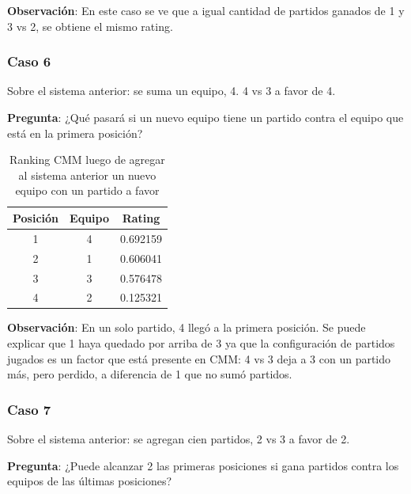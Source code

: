\textbf{Observación}: En este caso se ve que a igual cantidad de partidos ganados de 1 y 3 vs 2, se obtiene el mismo rating.

\subsubsection*{Caso 6}

Sobre el sistema anterior: se suma un equipo, 4. 4 vs 3 a favor de 4.

\textbf{Pregunta}: ¿Qué pasará si un nuevo equipo tiene un partido contra el equipo que está en la primera posición?

\begin{table}[h!]
    \begin{center}
        \begin{tabular}{|c|c|c|}
        \hline
        \textbf{Posición} & \textbf{Equipo} & \textbf{Rating} \\
        \hline
        1 & 4 & 0.692159\\
        2 & 1 & 0.606041\\
        3 & 3 & 0.576478\\
        4 & 2 & 0.125321\\
        \hline
        \end{tabular}
        \caption{Ranking CMM luego de agregar al sistema anterior un nuevo equipo con un partido a favor}
        \label{cmm_caso_6}
    \end{center}
\end{table}

\textbf{Observación}: En un solo partido, 4 llegó a la primera posición. Se puede explicar que 1 haya quedado por arriba de 3 ya que la configuración de partidos jugados es un factor que está presente en CMM: 4 vs 3 deja a 3 con un partido más, pero perdido, a diferencia de 1 que no sumó partidos.

\newpage

\subsubsection*{Caso 7}

Sobre el sistema anterior: se agregan cien partidos, 2 vs 3 a favor de 2.

\textbf{Pregunta}: ¿Puede alcanzar 2 las primeras posiciones si gana partidos contra los equipos de las últimas posiciones?

